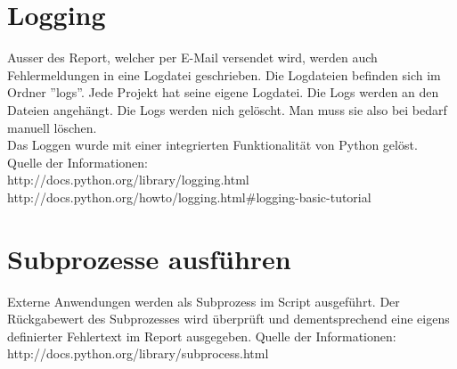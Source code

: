 \section{Logging}
Ausser des Report, welcher per E-Mail versendet wird, werden auch Fehlermeldungen in eine Logdatei geschrieben. Die Logdateien befinden sich im Ordner ''logs''. Jede Projekt hat seine eigene Logdatei. Die Logs werden an den Dateien angehängt. Die Logs werden nich gelöscht. Man muss sie also bei bedarf manuell löschen. \\
Das Loggen wurde mit einer integrierten Funktionalität von Python gelöst. \\
Quelle der Informationen: \\
http://docs.python.org/library/logging.html
http://docs.python.org/howto/logging.html\#logging-basic-tutorial \\

\section{Subprozesse ausführen}
Externe Anwendungen werden als Subprozess im Script ausgeführt. Der Rückgabewert des Subprozesses wird überprüft und dementsprechend eine eigens definierter Fehlertext im Report ausgegeben.
Quelle der Informationen: \\
http://docs.python.org/library/subprocess.html

